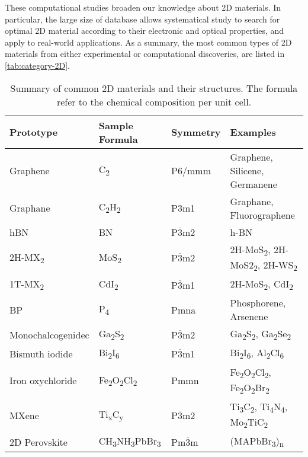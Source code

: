 These computational studies broaden our knowledge about 2D
materials. In particular, the large size of database allows
systematical study to search for optimal 2D material according to
their electronic and optical properties, and apply to real-world
applications. As a summary, the most common types of 2D materials from
either experimental or computational discoveries, are listed in
\autoref{tab:category-2D}.

\begin{table}
  \centering
  \caption{Summary of common 2D materials and their structures. The
    formula refer to the chemical composition per unit cell.}
  \label{tab:category-2D}
  \begin{tabularx}{1.00\textwidth}{XXXX}
    \hline
    Prototype  & Sample Formula  & Symmetry & Examples \\
    \hline
    Graphene & C\textsubscript{2} &  P6/mmm & Graphene, Silicene, Germanene \\
    Graphane & C\textsubscript{2}H\textsubscript{2} &  P3m1 & Graphane, Fluorographene\\
    hBN      & BN                & P$\overline{3}$m2 & h-BN \\
    2H-MX\textsubscript{2} & MoS\textsubscript{2} & P$\overline{3}$m2 & 2H-MoS\textsubscript{2}, 2H-MoS2\textsubscript{2}, 2H-WS\textsubscript{2} \\
    1T-MX\textsubscript{2} & CdI\textsubscript{2} & P$\overline{3}$m1 & 2H-MoS\textsubscript{2}, CdI\textsubscript{2}\\
    BP & P\textsubscript{4} & Pmna & Phosphorene, Arsenene \\
    Monochalcogenidec & Ga\textsubscript{2}S\textsubscript{2} & P$\overline{3}$m2 & Ga\textsubscript{2}S\textsubscript{2}, Ga\textsubscript{2}Se\textsubscript{2} \\
    Bismuth iodide &  Bi\textsubscript{2}I\textsubscript{6} & P$\overline{3}$m1 & Bi\textsubscript{2}I\textsubscript{6}, Al\textsubscript{2}Cl\textsubscript{6} \\
    Iron oxychloride                &  Fe\textsubscript{2}O\textsubscript{2}Cl\textsubscript{2} & Pmmn & Fe\textsubscript{2}O\textsubscript{2}Cl\textsubscript{2}, Fe\textsubscript{2}O\textsubscript{2}Br\textsubscript{2}  \\
    MXene & Ti\textsubscript{x}C\textsubscript{y} & P$\overline{3}$m2 & Ti\textsubscript{3}C\textsubscript{2}, Ti\textsubscript{4}N\textsubscript{4}, Mo\textsubscript{2}TiC\textsubscript{2} \\
    2D Perovskite & CH\textsubscript{3}NH\textsubscript{3}PbBr\textsubscript{3} & Pm$\overline{3}$m & (MAPbBr\textsubscript{3})\textsubscript{n}\\
   \hline
\end{tabularx}
\end{table}


